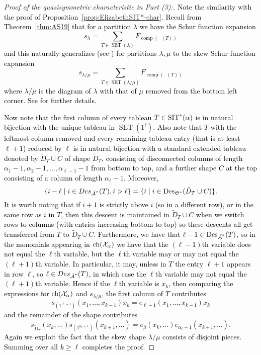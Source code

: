 \documentclass[12pt,letterpaper]{amsart}
\newcommand{\svwtwo}{\textcolor{black}}
\theoremstyle{definition}
\DeclareMathOperator{\comp}{comp}
\newcommand{\dI}{\mathfrak{S}^*}
\DeclareMathOperator{\Des}{Des}
\DeclareMathOperator{\DesI}{Des_{\dI}}
\newcommand{\SET}{\ensuremath{\operatorname{SET}}} \newcommand{\NSET}{\ensuremath{\operatorname{NSET}}}\newcommand{\SRCT}{\ensuremath{\operatorname{SRCT}}}
\newcommand{\suchthat}{\;|\;}
\begin{document}
\begin{proof}[Proof of the quasisymmetric characteristic in Part (3):] 

\svwtwo{Note the similarity with the proof of Proposition~\ref{prop:ElizabethSIT*-char}. Recall from Theorem~\ref{thm:AS19} that for a partition $\lambda$ we have the Schur function expansion
$$s_\lambda = \sum _{T\in \SET (\lambda)} F_{\comp (\DesI (T))}$$and this naturally generalizes (see \cite[Theorem~7.19.7]{RPSEC21999}) for partitions $\lambda, \mu$ to the skew Schur function expansion 
$$s_{\lambda/\mu} = \sum _{T\in \SET (\lambda/\mu)} F_{\comp (\DesI (T))}$$where $\lambda/\mu$ is the diagram of $\lambda$ with that of $\mu$ removed from the bottom left corner. See \cite{gessel} for further details.}

\svwtwo{Now note that the first column of every tableau $T\in \operatorname{SIT} ^* (\alpha)$ is in natural bijection with the unique tableau in $\SET(1^\ell)$.  Also note that $T$ with the leftmost column removed and every remaining tableau entry (that is at least $\ell +1$) reduced by $\ell$ is in natural bijection with a standard extended tableau denoted by $\tilde{D}_T\cup C$  of shape $\tilde{D}_T$, consisting of disconnected columns of length $\alpha _1 -1, \alpha _2 -1, \ldots , \alpha _{\ell -1} -1$ from bottom to top, and a further shape $C$ at the top consisting of a column of length $\alpha _{\ell} -1$. Moreover, 
$$\{ i-\ell \suchthat i\in Des_{\bA^*}  (T), i>\ell \} = \{ i \suchthat i\in \DesI (\tilde{D}_T \cup C) \}.$$It is worth noting that if $i+1$ is strictly above $i$ (so in a different row), or in the same row as $i$ in $T$, then this descent is maintained in $\tilde{D}_T \cup C$ when we switch rows to columns (with entries increasing bottom to top) so these descents all get transferred from $T$ to $\tilde{D}_T \cup C$.
Furthermore, we have that $\ell -1 \in \Des _{\bA^*}  (T)$, so in the monomials appearing in $\operatorname{\mathrm{ch}}(\mathcal{X}_\alpha)$ we have that the $(\ell-1)$th variable does not equal the $\ell$th variable, but the $\ell$th variable may or may not equal the $(\ell+1)$th variable. In particular, it may, unless in $T$ the entry $\ell+1$ appears in  row  $\ell$, so $\ell \in Des_{\operatorname{\bar{\mathcal{A}}}^*}(T)$, in which case the $\ell$th variable may not equal the $(\ell+1)$th variable. Hence if the $\ell$th variable is $x_k$, then comparing the expressions for $\operatorname{\mathrm{ch}}(\mathcal{X}_\alpha)$ and $s_{\lambda /\mu}$, the first column of $T$ contributes
$$s_{(1^{\ell -1})}(x_1,\ldots,x_{k-1})x_k=e_{\ell-1}(x_1,\ldots,x_{k-1}) x_k$$and the remainder of the shape contributes
$$s_{\tilde{D}_T}(x_k,\ldots) s_{(1^{\alpha _\ell -1})}(x_{k+1},\ldots)= e_\beta(x_k,\ldots)e_{\alpha_\ell - 1}(x_{k+1},\ldots).$$ Again we exploit the fact that the skew shape $\lambda/\mu$ consists of disjoint pieces. Summing over all $k\geq \ell$ completes the proof.}
\end{proof}
\end{document}
